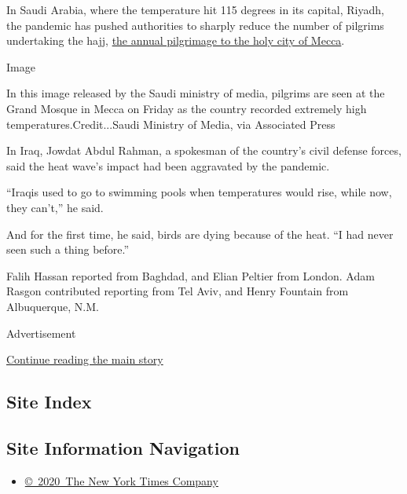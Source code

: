 In Saudi Arabia, where the temperature hit 115 degrees in its capital,
Riyadh, the pandemic has pushed authorities to sharply reduce the number
of pilgrims undertaking the hajj,
\href{https://www.nytimes3xbfgragh.onion/2020/07/30/world/middleeast/pilgrims-hajj-mecca-coronavirus-pandemic.html}{the
annual pilgrimage to the holy city of Mecca}.

Image

In this image released by the Saudi ministry of media, pilgrims are seen
at the Grand Mosque in Mecca on Friday as the country recorded extremely
high temperatures.Credit...Saudi Ministry of Media, via Associated Press

In Iraq, Jowdat Abdul Rahman, a spokesman of the country's civil defense
forces, said the heat wave's impact had been aggravated by the pandemic.

``Iraqis used to go to swimming pools when temperatures would rise,
while now, they can't,'' he said.

And for the first time, he said, birds are dying because of the heat.
``I had never seen such a thing before.''

Falih Hassan reported from Baghdad, and Elian Peltier from London. Adam
Rasgon contributed reporting from Tel Aviv, and Henry Fountain from
Albuquerque, N.M.

Advertisement

\protect\hyperlink{after-bottom}{Continue reading the main story}

\hypertarget{site-index}{%
\subsection{Site Index}\label{site-index}}

\hypertarget{site-information-navigation}{%
\subsection{Site Information
Navigation}\label{site-information-navigation}}

\begin{itemize}
\tightlist
\item
  \href{https://help.nytimes3xbfgragh.onion/hc/en-us/articles/115014792127-Copyright-notice}{©~2020~The
  New York Times Company}
\end{itemize}

